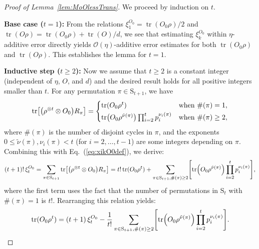 \documentclass[aps,prl,twocolumn,nofootinbib,superscriptaddress,10pt]{revtex4-2}
\let\originalleft\left
\let\originalright\right
\renewcommand{\left}{\mathopen{}\mathclose\bgroup\originalleft}
\renewcommand{\right}{\aftergroup\egroup\originalright}
\DeclareMathOperator{\Tr}{tr}
\theoremstyle{plain}
\theoremstyle{definition}
\newcommand{\eref}[1]{Eq.~\textup{(\ref{#1})}}
\newcommand{\lref}[1]{Lemma~\ref{#1}}
\begin{document}
\begin{proof}[Proof of \lref{lem:MoOlessTrans}]
We proceed by induction on $t$. 

\textbf{Base case ($t=1$):} 
From the relations $\xi_1^{O_0}=\Tr(O_0\rho)/2$ and $\Tr(O\rho)=\Tr(O_0\rho)+\Tr(O)/d$, 
we see that estimating $\xi_k^{O_0}$ within $\eta$-additive error directly yields $\mathcal{O}(\eta)$-additive error estimates for both $\Tr(O_0\rho)$ and $\Tr(O\rho)$. This establishes the lemma for $t=1$.

\textbf{Inductive step ($t \geq 2$):} 
Now we assume that $t\geq2$ is a constant integer (independent of $\eta$, $O$, and $d$) and the desired result holds for all positive integers smaller than $t$. 
For any permutation $\pi \in \mathrm{S}_{t+1}$, we have 
\begin{align}
\Tr\left[ \left(\rho^{\otimes t} \otimes O_0 \right)R_\pi\right]   
=
\begin{cases}
\Tr(O_0\rho^t) &  \text{when } \#(\pi)=1, \\
\vspace{-1.2em} \\
\Tr\left( O_0\rho^{\tilde{\nu}(\pi)} \right) \prod_{i=2}^{t} p_i^{\nu_i(\pi)}   &  \text{when } \#(\pi)\geq 2,  
\end{cases}
\end{align}
where $\#(\pi)$ is the number of disjoint cycles in $\pi$, and the exponents $0\leq \tilde{\nu}(\pi),\nu_i(\pi)<t$ (for $i=2,\dots,t-1$) are some integers depending on $\pi$. 
Combining this with \eref{eq:xikO0def}, we derive:
\begin{align}
(t+1)!\,\xi_t^{O_0}= 
\sum_{\pi\in \mathrm{S}_{t+1}}  \Tr\left[ \left(\rho^{\otimes t} \otimes O_0 \right)R_\pi\right]
=t!\Tr(O_0\rho^t) + \sum_{\pi\in \mathrm{S}_{t+1},\#(\pi)\geq 2} 
\left[ \Tr\left( O_0\rho^{\tilde{\nu}(\pi)} \right) \prod_{i=2}^{t} p_i^{\nu_i(\pi)} \right] ,
\end{align}
where the first term uses the fact that the number of permutations in $\mathrm{S}_t$ with $\#(\pi)=1$ is $t!$. 
Rearranging this relation yields:
\begin{align}\label{eq:ptOExp1}
\Tr(O_0\rho^t) 
= (t+1)\,\xi_t^{O_0} 
- \frac{1}{t!} \sum_{\pi\in \mathrm{S}_{t+1},\#(\pi)\geq 2} 
\left[ \Tr\left( O_0\rho^{\tilde{\nu}(\pi)} \right) \prod_{i=2}^{t} p_i^{\nu_i(\pi)} \right]. 
\end{align}



\end{proof}
\end{document}
